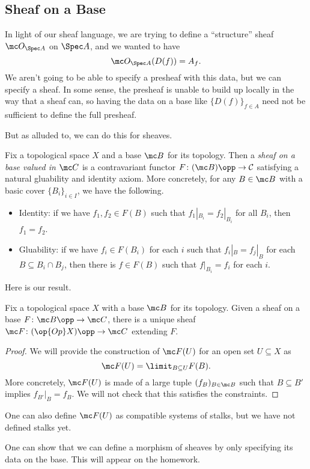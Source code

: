 \documentclass[../notes.tex]{subfiles}
\begin{document}
\subsection{Sheaf on a Base}
In light of our sheaf language, we are trying to define a ``structure'' sheaf $\mc O_{\Spec A}$ on $\Spec A$, and we wanted to have
\[\mc O_{\Spec A}(D(f))=A_f.\]
We aren't going to be able to specify a presheaf with this data, but we can specify a sheaf. In some sense, the presheaf is unable to build up locally in the way that a sheaf can, so having the data on a base like $\{D(f)\}_{f\in A}$ need not be sufficient to define the full presheaf.

But as alluded to, we can do this for sheaves.
\begin{definition}
	Fix a topological space $X$ and a base $\mc B$ for its topology. Then a \textit{sheaf on a base valued in $\mc C$} is a contravariant functor $F\colon(\mc B)\opp\to\mathcal C$ satisfying a natural gluability and identity axiom. More concretely, for any $B\in\mc B$ with a basic cover $\{B_i\}_{i\in I}$, we have the following.
	\begin{itemize}
		\item Identity: if we have $f_1,f_2\in F(B)$ such that $f_1|_{B_i}=f_2|_{B_i}$ for all $B_i$, then $f_1=f_2$.
		\item Gluability: if we have $f_i\in F(B_i)$ for each $i$ such that $f_i|_{B}=f_j|_{B}$ for each $B\subseteq B_i\cap B_j$, then there is $f\in F(B)$ such that $f|_{B_i}=f_i$ for each $i$.
	\end{itemize}
\end{definition}
Here is our result.
\begin{proposition} \label{prop:sheaffrombase}
	Fix a topological space $X$ with a base $\mc B$ for its topology. Given a sheaf on a base $F\colon\mc B\opp\to\mc C$, there is a unique sheaf $\mc F\colon(\op{Op}X)\opp\to\mc C$ extending $F$.
\end{proposition}
\begin{proof}
	We will provide the construction of $\mc F(U)$ for an open set $U\subseteq X$ as
	\[\mc F(U)=\limit_{B\subseteq U}F(B).\]
	More concretely, $\mc F(U)$ is made of a large tuple $(f_B)_{B\in\mc B}$ such that $B\subseteq B'$ implies $f_{B'}|_B=f_B$. We will not check that this satisfies the constraints.
\end{proof}
\begin{remark}
	One can also define $\mc F(U)$ as compatible systems of stalks, but we have not defined stalks yet.
\end{remark}
\begin{remark}
	One can show that we can define a morphism of sheaves by only specifying its data on the base. This will appear on the homework.
\end{remark}
\end{document}
